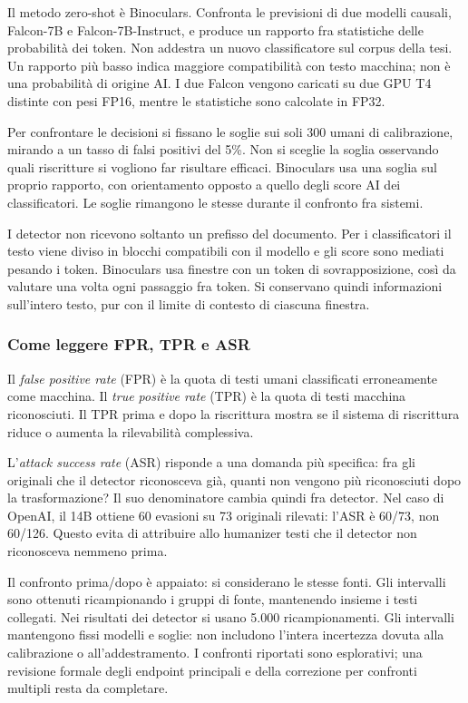 Il metodo zero-shot è Binoculars. Confronta le previsioni di due modelli causali, Falcon-7B e Falcon-7B-Instruct, e produce un rapporto fra statistiche delle probabilità dei token. Non addestra un nuovo classificatore sul corpus della tesi. Un rapporto più basso indica maggiore compatibilità con testo macchina; non è una probabilità di origine AI. I due Falcon vengono caricati su due GPU T4 distinte con pesi FP16, mentre le statistiche sono calcolate in FP32.

Per confrontare le decisioni si fissano le soglie sui soli 300 umani di calibrazione, mirando a un tasso di falsi positivi del 5\%. Non si sceglie la soglia osservando quali riscritture si vogliono far risultare efficaci. Binoculars usa una soglia sul proprio rapporto, con orientamento opposto a quello degli score AI dei classificatori. Le soglie rimangono le stesse durante il confronto fra sistemi.

I detector non ricevono soltanto un prefisso del documento. Per i classificatori il testo viene diviso in blocchi compatibili con il modello e gli score sono mediati pesando i token. Binoculars usa finestre con un token di sovrapposizione, così da valutare una volta ogni passaggio fra token. Si conservano quindi informazioni sull'intero testo, pur con il limite di contesto di ciascuna finestra.

\subsubsection{Come leggere FPR, TPR e ASR}\label{come-leggere-fpr-tpr-e-asr}

Il \emph{false positive rate} (FPR) è la quota di testi umani classificati erroneamente come macchina. Il \emph{true positive rate} (TPR) è la quota di testi macchina riconosciuti. Il TPR prima e dopo la riscrittura mostra se il sistema di riscrittura riduce o aumenta la rilevabilità complessiva.

L'\emph{attack success rate} (ASR) risponde a una domanda più specifica: fra gli originali che il detector riconosceva già, quanti non vengono più riconosciuti dopo la trasformazione? Il suo denominatore cambia quindi fra detector. Nel caso di OpenAI, il 14B ottiene 60 evasioni su 73 originali rilevati: l'ASR è 60/73, non 60/126. Questo evita di attribuire allo humanizer testi che il detector non riconosceva nemmeno prima.

Il confronto prima/dopo è appaiato: si considerano le stesse fonti. Gli intervalli sono ottenuti ricampionando i gruppi di fonte, mantenendo insieme i testi collegati. Nei risultati dei detector si usano 5.000 ricampionamenti. Gli intervalli mantengono fissi modelli e soglie: non includono l'intera incertezza dovuta alla calibrazione o all'addestramento. I confronti riportati sono esplorativi; una revisione formale degli endpoint principali e della correzione per confronti multipli resta da completare.


